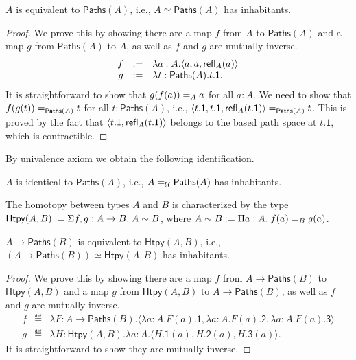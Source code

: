 \documentclass{article}
\newcommand{\calU}{\mathcal{U}}
\begin{document}
\begin{lemma}
	$A$ is equivalent to $\mathsf{Paths}(A)$, i.e., $A \simeq 
	\mathsf{Paths}(A)$ has inhabitants.
\end{lemma}
\begin{proof}
	We prove this by showing there are a map $f$ from $A$ to 
	$\mathsf{Paths}(A)$ and a map $g$ from $\mathsf{Paths}(A)$ to $A$, as 
	well as $f$ and $g$ are mutually inverse.
	\[
	\begin{array}{rcl}
	f & \eqdef & \lambda a :A. \langle a, a, \refl{A}{a} \rangle \\
	g & \eqdef & \lambda t : \mathsf{Paths}(A). t.\mathsf{1}.
	\end{array}
	\]
	It is straightforward to show that $\Ideq{A}{g(f(a))}{a}$ for all $a : A$.
	We need to show that $\Ideq{\mathsf{Paths}(A)}{f(g(t))}{t}$ for all $t : 
	\mathsf{Paths}(A)$, i.e., $\Ideq{\mathsf{Paths}(A)}{\langle t.\mathsf{1}, 
	t.\mathsf{1}, \refl{A}{t.\mathsf{1}} \rangle }{t}$.
	This is proved by the fact that $\langle t.\mathsf{1}, 
	\refl{A}{t.\mathsf{1}} \rangle$ belongs to the based path space at 
	$t.\mathsf{1}$, which is contractible.
\end{proof}

By univalence axiom we obtain the following identification.

\begin{corollary}
	$A$ is identical to $\mathsf{Paths}(A)$, i.e., 
	$\Ideq{\calU}{A}{\mathsf{Paths}(A)}$ has inhabitants.
\end{corollary}

\begin{definition}[Homotopies]
	The homotopy between types $A$ and $B$ is characterized by the 
	type $\mathsf{Htpy}(A,B) \eqdef \hsigtype{f,g}{A \to B}{A \sim B}$, where 
	$A \sim B \eqdef \hpitype{a}{A}{\Ideq{B}{f(a)}{g(a)}}$.
\end{definition}

\begin{lemma}
	$A \to \mathsf{Paths}(B)$ is equivalent to $\mathsf{Htpy}(A,B)$, i.e., $(A 
	\to \mathsf{Paths}(B)) \simeq \mathsf{Htpy}(A,B)$ has inhabitants.
\end{lemma}
\begin{proof}
	We prove this by showing there are a map $f$ from $A \to 
	\mathsf{Paths}(B)$ to $\mathsf{Htpy}(A,B)$ and a map $g$ from 
	$\mathsf{Htpy}(A,B)$ to $A \to \mathsf{Paths}(B)$, as well as $f$ and $g$ 
	are mutually inverse.
	\[
	\begin{array}{rcl}
	f & \eqdef & \lambda F : A \to \mathsf{Paths}(B). \langle \lambda a : A. 
	F(a).\mathsf{1}, \lambda a : A. F(a).\mathsf{2}, \lambda a:A. 
	F(a).\mathsf{3} \rangle \\
	g & \eqdef & \lambda H : \mathsf{Htpy}(A,B). \lambda a : A. \langle 
	H.\mathsf{1}(a), H.\mathsf{2}(a), H.\mathsf{3}(a) \rangle.
	\end{array}
	\] 
	It is straightforward to show they are mutually inverse.
\end{proof}
\end{document}

